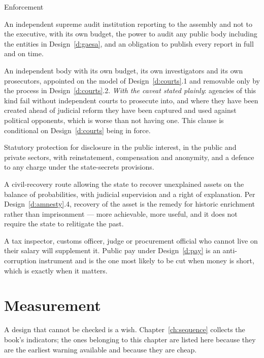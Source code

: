\begin{design}{Enforcement}
\label{d:enforce}
\begin{rules}
 An independent supreme audit institution reporting to the
assembly and not to the executive, with its own budget, the power to audit any
public body including the entities in Design~\ref{d:gaesa}, and an obligation to
publish every report in full and on time.

 An independent body with its own budget, its own
investigators and its own prosecutors, appointed on the model of
Design~\ref{d:courts}.1 and removable only by the process in
Design~\ref{d:courts}.2. \emph{With the caveat stated plainly}: agencies of this
kind fail without independent courts to prosecute into, and where they have been
created ahead of judicial reform they have been captured and used against
political opponents, which is worse than not having one. This clause is
conditional on Design~\ref{d:courts} being in force.

 Statutory protection for disclosure in the public
interest, in the public and private sectors, with reinstatement, compensation and
anonymity, and a defence to any charge under the state-secrets provisions.

 A civil-recovery route allowing the state to recover
unexplained assets on the balance of probabilities, with judicial supervision and
a right of explanation. Per Design~\ref{d:amnesty}.4, recovery of the asset is the
remedy for historic enrichment rather than imprisonment --- more achievable,
more useful, and it does not require the state to relitigate the past.

 A tax inspector, customs officer, judge or procurement
official who cannot live on their salary will supplement it. Public pay under
Design~\ref{d:pay} is an anti-corruption instrument and is the one most likely to
be cut when money is short, which is exactly when it matters.
\end{rules}
\end{design}

\section{Measurement}

A design that cannot be checked is a wish. Chapter~\ref{ch:sequence} collects the
book's indicators; the ones belonging to this chapter are listed here because
they are the earliest warning available and because they are cheap.

